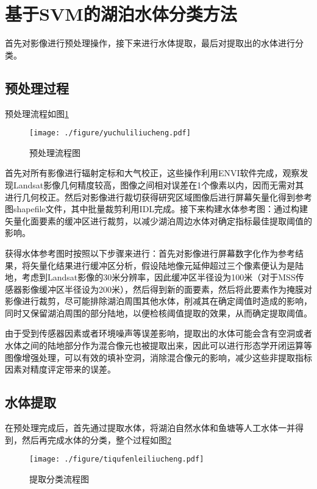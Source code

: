 \documentclass[supercite]{upcthesis}
\begin{document}
\section{基于SVM的湖泊水体分类方法}
首先对影像进行预处理操作，接下来进行水体提取，最后对提取出的水体进行分类。
\subsection{预处理过程}
预处理流程如图\ref{yuchuliliucheng}
\begin{figure}[htbp]
\centering
\texttt{[image: ./figure/yuchuliliucheng.pdf]}
\caption{预处理流程图}
\label{yuchuliliucheng}
\end{figure}

首先对所有影像进行辐射定标和大气校正，这些操作利用ENVI软件完成，观察发现Landsat影像几何精度较高，图像之间相对误差在1个像素以内，因而无需对其进行几何校正。然后对影像进行裁切获得研究区域图像后进行屏幕矢量化得到参考图shapefile文件，其中批量裁剪利用IDL完成。接下来构建水体参考图：通过构建矢量化面要素的缓冲区进行裁剪，以减少湖泊周边水体对确定指标最佳提取阈值的影响。

获得水体参考图时按照以下步骤来进行：首先对影像进行屏幕数字化作为参考结果，将矢量化结果进行缓冲区分析，假设陆地像元延伸超过三个像素便认为是陆地，考虑到Landsat影像的30米分辨率，因此缓冲区半径设为100米（对于MSS传感器影像缓冲区半径设为200米），然后得到新的面要素，然后将此要素作为掩膜对影像进行裁剪，尽可能排除湖泊周围其他水体，削减其在确定阈值时造成的影响，同时又保留湖泊周围的部分陆地，以便检核阈值提取的效果，从而确定提取阈值。

由于受到传感器因素或者环境噪声等误差影响，提取出的水体可能会含有空洞或者水体之间的陆地部分作为混合像元也被提取出来，因此可以进行形态学开闭运算等图像增强处理，可以有效的填补空洞，消除混合像元的影响，减少这些非提取指标因素对精度评定带来的误差。
\subsection{水体提取}
在预处理完成后，首先通过提取水体，将湖泊自然水体和鱼塘等人工水体一并得到，然后再完成水体的分类，整个过程如图\ref{tiqufenleiliucheng}
\begin{figure}[htbp]
	\centering
	\texttt{[image: ./figure/tiqufenleiliucheng.pdf]}
	\caption{提取分类流程图}
	\label{tiqufenleiliucheng}
\end{figure}
\end{document}
